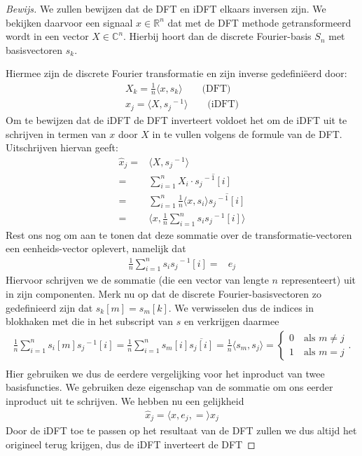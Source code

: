 \documentclass[11pt]{amsart}
\newcommand{\R}{\mathbb{R}}
\newcommand{\C}{\mathbb{C}}
\theoremstyle{remark}
\newcommand{\eq}[1]{\begin{eqnarray*} #1 \end{eqnarray*}}
\newcommand{\repr}[1]{{#1}^{\!\!-1}}
\newcommand{\inpr}[2]{\langle #1 , #2 \rangle}
\begin{document}
\begin{proof}[Bewijs]
We zullen bewijzen dat de DFT en iDFT elkaars inversen zijn.
We bekijken daarvoor een signaal $x\in\R^n$ dat met de DFT methode getransformeerd wordt in een vector $X\in\C^n$.
Hierbij hoort dan de discrete Fourier-basis $S_n$ met basisvectoren $s_k$. 

Hiermee zijn de discrete Fourier transformatie en zijn inverse gedefini\"eerd door:
\eq{
  X_k = \tfrac 1 n \langle x, s_k \rangle \quad\quad \text{(DFT)}\\
  x_j =  \langle X, \repr{s_j} \rangle \quad\quad\text{(iDFT)}
}
Om te bewijzen dat de iDFT de DFT inverteert voldoet het om de iDFT uit te schrijven in termen van $x$ 
door $X$ in te vullen volgens de formule van de DFT. Uitschrijven hiervan geeft:
\eq{
  \hat x_j =&  \langle X , \repr{s_j} \rangle \\
      =&  \sum_{i=1}^n X_i\cdot \overline{\repr{s_j}[i]} \\
      =&  \sum_{i=1}^n \tfrac1n\inpr{x}{s_i} \overline{\repr{s_j}[i]} \\
      =& \langle x , \frac1n \sum_{i=1}^n s_i \repr{s_j}[i] \rangle
}
Rest ons nog om aan te tonen dat deze sommatie over de transformatie-vectoren een eenheids-vector oplevert, 
namelijk dat
\eq{
  \frac1n \sum_{i=1}^n s_i \repr{s_j}[i] =& e_j
}
Hiervoor schrijven we de sommatie (die een vector van lengte $n$ representeert) uit in zijn componenten. 
Merk nu op dat de discrete Fourier-basisvectoren zo gedefinieerd zijn dat $s_k[m] = s_m[k]$. 
We verwisselen dus de indices in blokhaken met die in het subscript van $s$ en verkrijgen daarmee
\eq{
  \frac1n \sum_{i=1}^n s_i[m] \repr{s_j}[i] = \frac1n \sum_{i=1}^n s_m[i] \overline{s_j[i]} 
=\tfrac1n \inpr{s_m}{s_j} = \begin{cases}0\quad\text{als }m\neq j\\1\quad\text{als }m=j\end{cases}.\\
}
Hier gebruiken we dus de eerdere vergelijking voor het inproduct van twee basisfuncties.
We gebruiken deze eigenschap van de sommatie om ons eerder inproduct uit te schrijven. 
We hebben nu een gelijkheid
\eq{
  \hat x_j = \inpr{x,e_j} = x_j
}
Door de iDFT toe te passen op het resultaat van de DFT zullen we dus altijd het origineel terug krijgen,
dus de iDFT inverteert de DFT
\end{proof}

\end{document}
